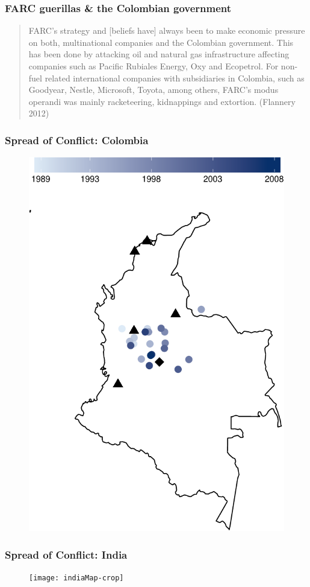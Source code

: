 \begin{frame}
\frametitle{FARC guerillas \& the Colombian government}

\begin{quote}FARC's strategy and [beliefs have] always been to make economic pressure on both, multinational companies and the Colombian government. This has been done by attacking oil and natural gas infrastructure affecting companies such as Pacific Rubiales Energy, Oxy and Ecopetrol. For non-fuel related international companies with subsidiaries in Colombia, such as Goodyear, Nestle, Microsoft, Toyota, among others, FARC’s modus operandi was mainly racketeering, kidnappings and extortion. (Flannery 2012)\end{quote}

\end{frame}

\begin{frame}
\frametitle{Spread of Conflict: Colombia}

\vspace{-8mm}
\begin{figure}[ht]
	\centering
	\includegraphics[width=.5\textwidth]{colombiaMap-crop}
\end{figure}

\end{frame}

\begin{frame}
\frametitle{Spread of Conflict: India}

\vspace{-8mm}
\begin{figure}[ht]
	\centering
	\texttt{[image: indiaMap-crop]}
\end{figure}

\end{frame}

